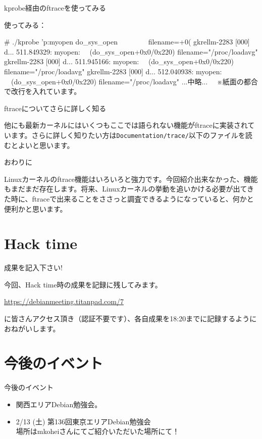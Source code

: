 \begin{frame}[containsverbatim]{kprobe経由のftraceを使ってみる}

  使ってみる：
\begin{commandlinesmall}
  # ./kprobe 'p:myopen do_sys_open
  　　　　filename=+0(%
  gkrellm-2283  [000] d...   511.849329: myopen:
  　(do_sys_open+0x0/0x220) filename="/proc/loadavg"
  gkrellm-2283  [000] d...   511.945166: myopen:
  　(do_sys_open+0x0/0x220) filename="/proc/loadavg"
  gkrellm-2283  [000] d...   512.040938: myopen:
  　(do_sys_open+0x0/0x220) filename="/proc/loadavg"
  ...中略...
　※紙面の都合で改行を入れています。
\end{commandlinesmall}  

\end{frame}  

\begin{frame}[containsverbatim]{ftraceについてさらに詳しく知る}

 他にも最新カーネルにはいくつもここでは語られない機能がftraceに実装されています。さらに詳しく知りたい方は\verb+Documentation/trace/+以下のファイルを読むとよいと思います。
  
\end{frame}  

\begin{frame}{おわりに}

 Linuxカーネルのftrace機能はいろいろと強力です。今回紹介出来なかった、機能もまだまだ存在します。将来、Linuxカーネルの挙動を追いかける必要が出てきた時に、ftraceで出来ることをささっと調査できるようになっていると、何かと便利かと思います。
  
\end{frame}

\section{Hack time}

\begin{frame}{成果を記入下さい!}

  今回、Hack time時の成果を記録に残してみます。

\url{https://debianmeeting.titanpad.com/7}

に皆さんアクセス頂き（認証不要です）、各自成果を18:20までに記録するようにおねがいします。

\end{frame}
  
\section{今後のイベント}
\begin{frame}{今後のイベント}
\begin{itemize}
\item 関西エリアDebian勉強会。
\item 2/13 (土) 第136回東京エリアDebian勉強会\\
  場所はmkoheiさんにてご紹介いただいた場所にて！
\end{itemize}
\end{frame}

